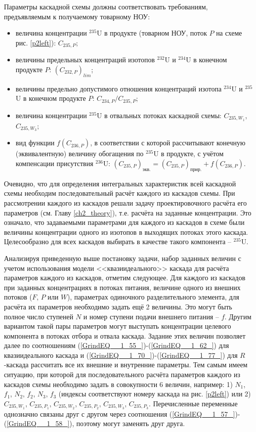 Параметры каскадной схемы должны соответствовать требованиям, предъявляемым к получаемому товарному НОУ:

\begin{itemize}
    \item величина концентрации $^{235}$U в продукте (товарном НОУ, поток $P$ на схеме рис. \ref{p2left}): $C_{235,{P}}$;
    \item величины предельных концентраций изотопов $^{232}$U и $^{234}$U в конечном продукте $P$: $(C_{232,{P}})_{lim}$;
    \item величины предельно допустимого отношения концентраций изотопа $^{234}$U и $^{235}$U в конечном продукте $P$: ${C_{234,{P}}}/{C_{235,{P}}}$;
    \item величина концентрации $^{235}$U в отвальных потоках каскадной схемы: $C_{235,{W_1}}$, $C_{235,{W_3}}$;
    \item вид функции $f(C_{236,P})$, в соответствии с которой рассчитывают конечную (эквивалентную) величину обогащения по $^{235}$U в продукте, с учётом компенсации присутствия $^{236}$U:
    $(C_{235,P})_\textit{экв.}=(C_{235,P})_\textit{прир.}+f(C_{236,P})$.    
\end{itemize}

Очевидно, что для определения интегральных характеристик всей каскадной схемы необходим последовательный расчёт каждого из каскадов схемы. При рассмотрении каждого из каскадов решали задачу проектировочного расчёта его параметров (см. Главу \ref{ch2_theory}), т.е. расчёта на заданные концентрации. Это означало, что задаваемыми параметрами для каждого из каскадов в схеме были величины концентрации одного из изотопов в выходящих потоках этого каскада. Целесообразно для всех каскадов выбирать в качестве такого компонента -- $^{235}$U.

Анализируя приведенную выше постановку задачи, набор заданных величин с учетом использования модели <<квазиидеального>> каскада для расчёта параметров каждого из каскадов, отметим следующее. Для каждого из каскадов при заданных концентрациях в потоках питания, величине одного из внешних потоков ($F$, $P$ или $W$), параметрах одиночного разделительного элемента, для расчёта их параметров необходимо задать ещё 2 величины. Это могут быть полное число ступеней $N$ и номер ступени подачи внешнего питания -- $f$. Другим вариантом такой пары параметров могут выступать концентрации целевого компонента в потоках отбора и отвала каскада. Задание этих величин позволяет далее по соотношениям (\ref{GrindEQ__1_55_})-(\ref{GrindEQ__1_62_}) для квазиидеального каскада и (\ref{GrindEQ__1_70_})-(\ref{GrindEQ__1_77_}) для $R$-каскада рассчитать все их внешние и внутренние параметры. Тем самым имеем ситуацию, при которой для последовательного расчёта параметров каждого из каскадов схемы необходимо задать в совокупности 6 величин, например: 1) $N_1$, $f_1$, $N_2$, $f_2$, $N_3$, $f_3$ (индексы соответствуют номеру каскада на рис. \ref{p2left}) или 2) $C_{235,{W_1}}$, $C_{235,{P_1}}$, $C_{235,{W_2}}$, $C_{235,{P_2}}$, $C_{235,{W_3}}$, $C_{235,{P_3}}$. Перечисленные переменные однозначно связаны друг с другом через соотношения (\ref{GrindEQ__1_57_})-(\ref{GrindEQ__1_58_}), поэтому могут заменять друг друга. 

